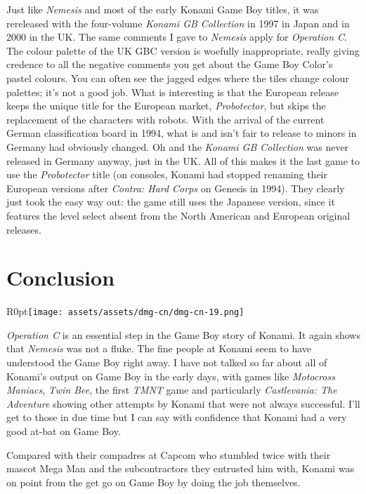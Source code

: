 \documentclass{book}
\begin{document}
Just like \emph{Nemesis} and most of the early Konami Game Boy titles, it was rereleased with the four-volume \emph{Konami GB Collection} in 1997 in Japan and in 2000 in the UK. The same comments I gave to \emph{Nemesis} apply for \emph{Operation C}. The colour palette of the UK GBC version is woefully inappropriate, really giving credence to all the negative comments you get about the Game Boy Color’s pastel colours. You can often see the jagged edges where the tiles change colour palettes; it’s not a good job. What is interesting is that the European release keeps the unique title for the European market, \emph{Probotector}, but skips the replacement of the characters with robots. With the arrival of the current German classification board in 1994, what is and isn’t fair to release to minors in Germany had obviously changed. Oh and the \emph{Konami GB Collection} was never released in Germany anyway, just in the UK. All of this makes it the last game to use the \emph{Probotector} title (on consoles, Konami had stopped renaming their European versions after \emph{Contra: Hard Corps} on Genesis in 1994). They clearly just took the easy way out: the game still uses the Japanese version, since it features the level select absent from the North American and European original releases.\par
\FloatBarrier\section*{Conclusion}
\begin{wrapfigure}{R}{0pt}{\texttt{[image: assets/assets/dmg-cn/dmg-cn-19.png]}}\end{wrapfigure}
\emph{Operation C} is an essential step in the Game Boy story of Konami. It again shows that \emph{Nemesis} was not a fluke. The fine people at Konami seem to have understood the Game Boy right away. I have not talked so far about all of Konami’s output on Game Boy in the early days, with games like \emph{Motocross Maniacs}, \emph{Twin Bee}, the first \emph{TMNT} game and particularly \emph{Castlevania: The Adventure} showing other attempts by Konami that were not always successful. I’ll get to those in due time but I can say with confidence that Konami had a very good at-bat on Game Boy.\par
Compared with their compadres at Capcom who stumbled twice with their mascot Mega Man and the subcontractors they entrusted him with, Konami was on point from the get go on Game Boy by doing the job themselves.\par
\end{document}
